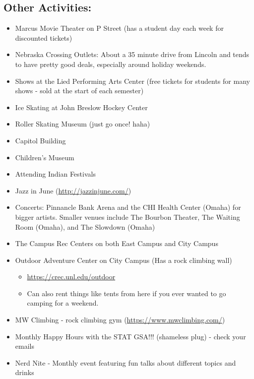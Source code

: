 \documentclass[
  12pt,
]{book}
\providecommand{\tightlist}{%
  \setlength{\itemsep}{0pt}\setlength{\parskip}{0pt}}
\begin{document}
\hypertarget{other-activities}{%
\subsection{Other Activities:}\label{other-activities}}

\begin{itemize}
\tightlist
\item
  Marcus Movie Theater on P Street (has a student day each week for discounted tickets)
\item
  Nebraska Crossing Outlets: About a 35 minute drive from Lincoln and tends to have pretty good deals, especially around holiday weekends.
\item
  Shows at the Lied Performing Arts Center (free tickets for students for many shows - sold at the start of each semester)
\item
  Ice Skating at John Breslow Hockey Center
\item
  Roller Skating Museum (just go once! haha)
\item
  Capitol Building
\item
  Children's Museum
\item
  Attending Indian Festivals
\item
  Jazz in June (\url{http://jazzinjune.com/})
\item
  Concerts: Pinnancle Bank Arena and the CHI Health Center (Omaha) for bigger artists. Smaller venues include The Bourbon Theater, The Waiting Room (Omaha), and The Slowdown (Omaha)
\item
  The Campus Rec Centers on both East Campus and City Campus
\item
  Outdoor Adventure Center on City Campus (Has a rock climbing wall)

  \begin{itemize}
  \tightlist
  \item
    \url{https://crec.unl.edu/outdoor}
  \item
    Can also rent things like tents from here if you ever wanted to go camping for a weekend.
  \end{itemize}
\item
  MW Climbing - rock climbing gym (\url{https://www.mwclimbing.com/})
\item
  Monthly Happy Hours with the STAT GSA!!! (shameless plug) - check your emails
\item
  Nerd Nite - Monthly event featuring fun talks about different topics and drinks


\end{itemize}
\end{document}
